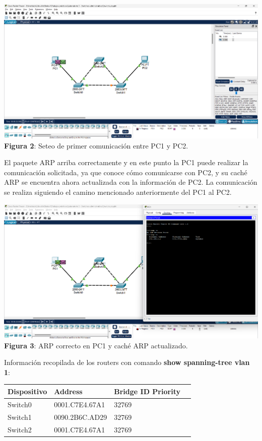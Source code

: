 \documentclass{article}
\begin{document}
    \begin{center}
        \includegraphics[width=0.875\linewidth]{img_03} 
        \linebreak
        \small {\bfseries Figura 2}: Seteo de primer comunicación entre PC1 y PC2.
    \end{center}

    \pagebreak
    El paquete ARP arriba correctamente y en este punto la PC1 puede realizar la comunicación solicitada, ya que conoce cómo comunicarse con PC2, y su caché ARP se encuentra ahora actualizada con la información de PC2. La comunicación se realiza siguiendo el camino mencionado anteriormente del PC1 al PC2.

    \begin{center}
        \includegraphics[width=0.875\linewidth]{img_04} 
        \linebreak
        \small {\bfseries Figura 3}: ARP correcto en PC1 y caché ARP actualizado.
    \end{center}

    Información recopilada de los routers con comando {\bfseries show spanning-tree vlan 1}:

    \begin{center}
        \begin{tabular}{| p{3cm} | p{4.1cm} | p{4.1cm} | p{4.1cm} |}\hline
            {\bfseries Dispositivo} & {\bfseries Address} & {\bfseries Bridge ID Priority} \\\hline
            Switch0 & 0001.C7E4.67A1 & 32769 \\\hline
            Switch1 & 0090.2B6C.AD29 & 32769 \\\hline
            Switch2 & 0001.C7E4.67A1 & 32769 \\\hline
        \end{tabular}
    \end{center}
\end{document}
